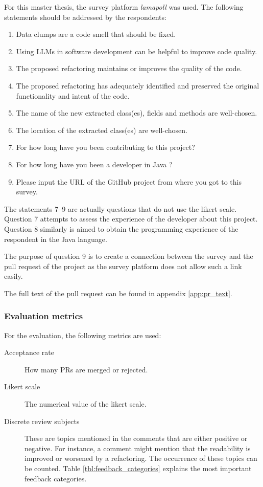 For this master thesis, the survey platform \textit{lamapoll} \cite{lamapoll} was used.  The following statements should be addressed by the respondents:
\begin{enumerate}
\item Data clumps are a code smell that should be fixed.
\item Using LLMs in software development can be helpful to improve code quality.
\item The proposed refactoring maintains or improves the quality of the code.
\item The proposed refactoring has  adequately identified and preserved the original functionality and intent of the code.
\item The name of the new extracted class(es), fields and methods are well-chosen.
 \item The location of the extracted class(es) are well-chosen.
 \item For how long have you been contributing to this project?
\item For how long have you been a developer in Java ? 
\item Please input the URL of the GitHub project from where you got to this survey.

\end{enumerate}


The statements 7--9 are actually questions that do not use the likert scale. Question 7 attempts to assess the experience of the developer about this project. Question 8 similarly is aimed to obtain the programming experience of the respondent in the Java language.

The purpose of question 9 is to create a connection between the survey and the pull request of the project as the survey platform does not allow such a link easily.

The full text of the pull request can be found in appendix \ref{app:pr_text}.


\subsubsection{Evaluation metrics}

For the evaluation, the following metrics are used:
\begin{description}
    \item [Acceptance rate] How many PRs are merged or rejected.
    \item [Likert scale] The numerical value of the likert scale.
    \item[Discrete review subjects] These are topics mentioned in the comments that are either positive or negative. For instance, a comment might mention that the readability is improved or worsened by a refactoring. The occurrence of these topics can be counted.   Table \ref{tbl:feedback_categories} explains the most important feedback categories. 

\end{description}

